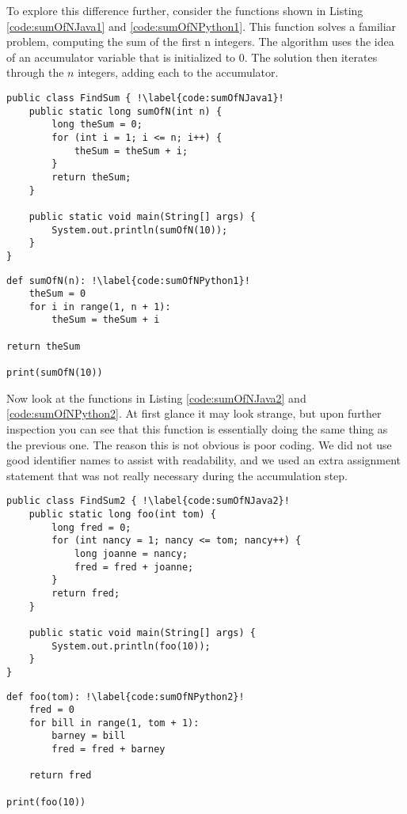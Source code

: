 To explore this difference further, consider the functions shown in Listing \ref{code:sumOfNJava1} and \ref{code:sumOfNPython1}. This function solves a familiar problem, computing the sum of the first n integers. The algorithm uses the idea of an accumulator variable that is initialized to 0. The solution then iterates through the $n$ integers, adding each to the accumulator.
\begin{verbatim}
public class FindSum { !\label{code:sumOfNJava1}!
	public static long sumOfN(int n) {
		long theSum = 0;
		for (int i = 1; i <= n; i++) {
			theSum = theSum + i;
		}
		return theSum;
	}
	
	public static void main(String[] args) {
		System.out.println(sumOfN(10));
	}
}
\end{verbatim}

\begin{verbatim}
def sumOfN(n): !\label{code:sumOfNPython1}!
	theSum = 0
	for i in range(1, n + 1):
		theSum = theSum + i

return theSum

print(sumOfN(10))
\end{verbatim}

Now look at the functions in Listing \ref{code:sumOfNJava2} and \ref{code:sumOfNPython2}. At first glance it may look strange, but upon further inspection you can see that this function is essentially doing the same thing as the previous one. The reason this is not obvious is poor coding. We did not use good identifier names to assist with readability, and we used an extra assignment statement that was not really necessary during the accumulation step.

\begin{verbatim}
public class FindSum2 { !\label{code:sumOfNJava2}!
	public static long foo(int tom) {
		long fred = 0;
		for (int nancy = 1; nancy <= tom; nancy++) {
			long joanne = nancy;
			fred = fred + joanne;
		}
		return fred;
	}
	
	public static void main(String[] args) {
		System.out.println(foo(10));
	}
}
\end{verbatim}

\begin{verbatim}
def foo(tom): !\label{code:sumOfNPython2}!
	fred = 0
	for bill in range(1, tom + 1):
		barney = bill
		fred = fred + barney
	
	return fred

print(foo(10))
\end{verbatim}

